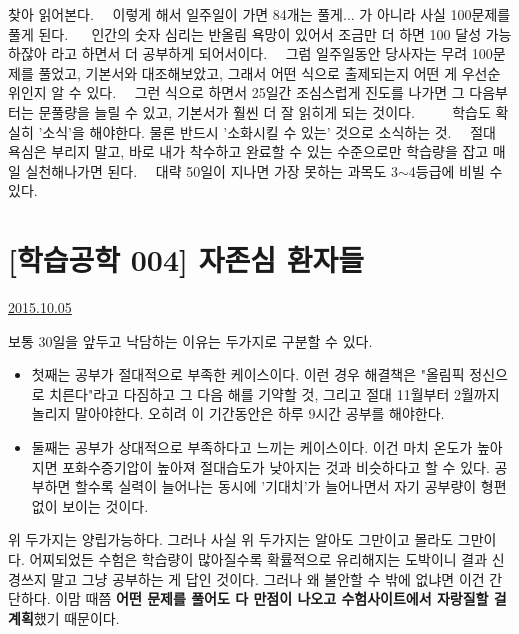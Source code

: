 찾아 읽어본다.   이렇게 해서 일주일이 가면 84개는 풀게... 가 아니라 사실 100문제를 풀게 된다.    인간의 숫자 심리는 반올림 욕망이 있어서 조금만 더 하면 100 달성 가능하잖아 라고 하면서 더 공부하게 되어서이다.   그럼 일주일동안 당사자는 무려 100문제를 풀었고, 기본서와 대조해보았고, 그래서 어떤 식으로 출제되는지 어떤 게 우선순위인지 알 수 있다.   그런 식으로 하면서 25일간 조심스럽게 진도를 나가면 그 다음부터는 문풀량을 늘릴 수 있고, 기본서가 훨씬 더 잘 읽히게 되는 것이다.      학습도 확실히 '소식'을 해야한다. 물론 반드시 '소화시킬 수 있는' 것으로 소식하는 것.   절대 욕심은 부리지 말고, 바로 내가 착수하고 완료할 수 있는 수준으로만 학습량을 잡고 매일 실천해나가면 된다.   대략 50일이 지나면 가장 못하는 과목도 3$\sim$4등급에 비빌 수 있다.





\section{[학습공학 004] 자존심 환자들}
\href{https://www.kockoc.com/Apoc/391905}{2015.10.05}

\vspace{5mm}

보통 30일을 앞두고 낙담하는 이유는 두가지로 구분할 수 있다.
\vspace{5mm}

\begin{itemize}
    \item 첫째는 공부가 절대적으로 부족한 케이스이다.
    이런 경우 해결책은 "올림픽 정신으로 치른다"라고 다짐하고 그 다음 해를 기약할 것,
    그리고 절대 11월부터 2월까지 놀리지 말아야한다. 오히려 이 기간동안은 하루 9시간 공부를 해야한다.
    \vspace{5mm}
    
    \item 둘째는 공부가 상대적으로 부족하다고 느끼는 케이스이다.
    이건 마치 온도가 높아지면 포화수증기압이 높아져 절대습도가 낮아지는 것과 비슷하다고 할 수 있다.
    공부하면 할수록 실력이 늘어나는 동시에 '기대치'가 늘어나면서 자기 공부량이 형편없이 보이는 것이다.
\end{itemize}
\vspace{5mm}

위 두가지는 양립가능하다. 그러나 사실 위 두가지는 알아도 그만이고 몰라도 그만이다.
어찌되었든 수험은 학습량이 많아질수록 확률적으로 유리해지는 도박이니 결과 신경쓰지 말고 그냥 공부하는 게 답인 것이다.
그러나 왜 불안할 수 밖에 없냐면 이건 간단하다.
이맘 때쯤 \textbf{어떤 문제를 풀어도 다 만점이 나오고 수험사이트에서 자랑질할 걸 계획}했기 때문이다.
\vspace{5mm}

